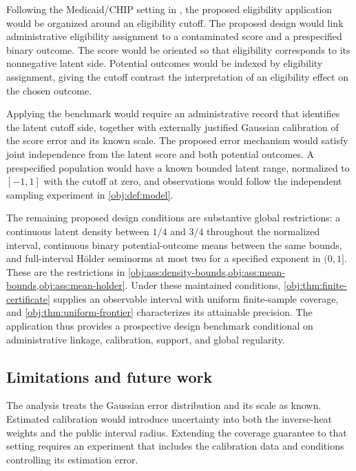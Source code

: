 \documentclass[11pt]{article}
\begin{document}
Following the Medicaid/CHIP setting in \citet[Chapter~2, Section~2.6]{Dong2018Thesis}, the proposed eligibility application would be organized around an eligibility cutoff.
The proposed design would link administrative eligibility assignment to a contaminated score and a prespecified binary outcome. The score would be oriented so that eligibility corresponds to its nonnegative latent side. Potential outcomes would be indexed by eligibility assignment, giving the cutoff contrast the interpretation of an eligibility effect on the chosen outcome.

Applying the benchmark would require an administrative record that identifies the latent cutoff side, together with externally justified Gaussian calibration of the score error and its known scale. The proposed error mechanism would satisfy joint independence from the latent score and both potential outcomes. A prespecified population would have a known bounded latent range, normalized to \([-1,1]\) with the cutoff at zero, and observations would follow the independent sampling experiment in \cref{obj:def:model}.

The remaining proposed design conditions are substantive global restrictions: a continuous latent density between \(1/4\) and \(3/4\) throughout the normalized interval, continuous binary potential-outcome means between the same bounds, and full-interval Hölder seminorms at most two for a specified exponent in \((0,1]\). These are the restrictions in \cref{obj:ass:density-bounds,obj:ass:mean-bounds,obj:ass:mean-holder}. Under these maintained conditions, \cref{obj:thm:finite-certificate} supplies an observable interval with uniform finite-sample coverage, and \cref{obj:thm:uniform-frontier} characterizes its attainable precision. The application thus provides a prospective design benchmark conditional on administrative linkage, calibration, support, and global regularity.

\subsection{Limitations and future work}

The analysis treats the Gaussian error distribution and its scale as known. Estimated calibration would introduce uncertainty into both the inverse-heat weights and the public interval radius. Extending the coverage guarantee to that setting requires an experiment that includes the calibration data and conditions controlling its estimation error.
\end{document}
